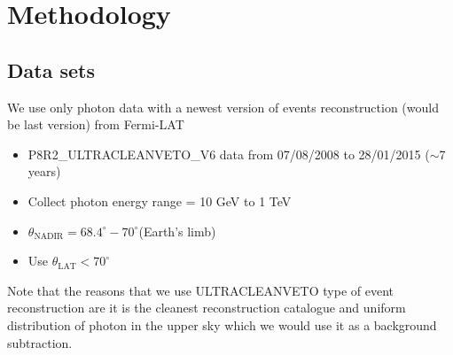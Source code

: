 \chapter{Methodology}

\section{Data sets}
We use only photon data with a newest version of events reconstruction (would be last version) from \acs{Fermi-LAT}
\begin{itemize}
    \item P8R2\_ULTRACLEANVETO\_V6 data from 07/08/2008 to 28/01/2015 ($\sim$7 years)
    \item Collect photon energy range = 10 GeV to 1 TeV
    \item $\theta_{\text{NADIR}} = 68.4^\circ - 70^\circ$(Earth’s limb) 
    \item Use $\theta_{\text{LAT}} < 70^\circ$
\end{itemize}
Note that the reasons that we use ULTRACLEANVETO type of event reconstruction are it is the cleanest reconstruction catalogue and uniform distribution of photon in the upper sky which we would use it as a background subtraction.

